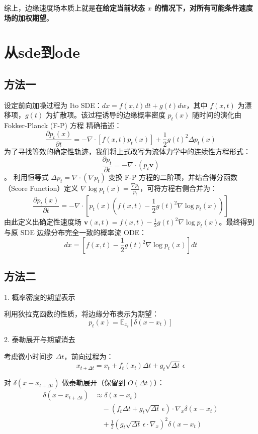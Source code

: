 综上，边缘速度场本质上就是\textbf{在给定当前状态 $x$ 的情况下，对所有可能条件速度场的加权期望}。
\section{从sde到ode}
\subsection{方法一}
设定前向加噪过程为 Ito SDE：$dx = f(x, t) dt + g(t) dw$，其中 $f(x, t)$ 为漂移项，$g(t)$ 为扩散项。该过程诱导的边缘概率密度 $p_t(x)$ 随时间的演化由 Fokker-Planck (F-P) 方程 精确描述：
$$\frac{\partial p_t(x)}{\partial t} = -\nabla \cdot \left[ f(x, t) p_t(x) \right] + \frac{1}{2} g(t)^2 \Delta p_t(x)$$
为了寻找等效的确定性轨迹，我们将上式改写为流体力学中的连续性方程形式：
$$\frac{\partial p_t}{\partial t} = -\nabla \cdot (p_t \mathbf{v})$$。
利用恒等式 $\Delta p_t = \nabla \cdot (\nabla p_t)$ 变换 F-P 方程的二阶项，并结合得分函数（Score Function）定义 $\nabla \log p_t(x) = \frac{\nabla p_t}{p_t}$，可将方程右侧合并为：$$\frac{\partial p_t(x)}{\partial t} = -\nabla \cdot \left[ p_t(x) \left( f(x, t) - \frac{1}{2} g(t)^2 \nabla \log p_t(x) \right) \right]$$由此定义出确定性速度场 $\mathbf{v}(x, t) = f(x, t) - \frac{1}{2} g(t)^2 \nabla \log p_t(x)$。最终得到与原 SDE 边缘分布完全一致的概率流 ODE：$$dx = \left[ f(x, t) - \frac{1}{2} g(t)^2 \nabla \log p_t(x) \right] dt$$
\subsection{方法二}
1. 概率密度的期望表示

利用狄拉克函数的性质，将边缘分布表示为期望：
\begin{equation*}
p_t(x) = \mathbb{E}_{x_t}[\delta(x - x_t)]
\end{equation*}

2. 泰勒展开与期望消去

考虑微小时间步 $\Delta t$，前向过程为：
\begin{equation*}
x_{t+\Delta t} = x_t + f_t(x_t)\Delta t + g_t\sqrt{\Delta t}\,\epsilon
\end{equation*}

对 $\delta(x - x_{t+\Delta t})$ 做泰勒展开（保留到 $O(\Delta t)$）：
\begin{align*}
\delta(x - x_{t+\Delta t}) 
&\approx \delta(x - x_t) \\
&\quad - (f_t \Delta t + g_t\sqrt{\Delta t}\,\epsilon) \cdot \nabla_x \delta(x - x_t) \\
&\quad + \frac{1}{2}(g_t\sqrt{\Delta t}\,\epsilon \cdot \nabla_x)^2 \delta(x - x_t)
\end{align*}

